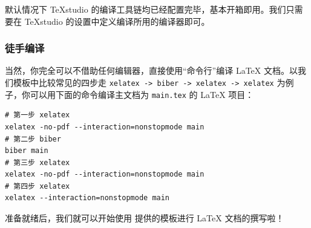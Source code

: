 默认情况下 \TeX studio 的编译工具链均已经配置完毕，基本开箱即用。我们只需要在 \TeX studio 的设置中定义编译所用的编译器即可。

\subsubsection{徒手编译}

当然，你完全可以不借助任何编辑器，直接使用“命令行”编译 {\LaTeX} 文档。以我们模板中比较常见的四步走 \texttt{xelatex -> biber -> xelatex -> xelatex} 为例子，你可以用下面的命令编译主文档为 \texttt{main.tex} 的 {\LaTeX} 项目：

\begin{verbatim}
# 第一步 xelatex
xelatex -no-pdf --interaction=nonstopmode main
# 第二步 biber
biber main
# 第三步 xelatex
xelatex -no-pdf --interaction=nonstopmode main
# 第四步 xelatex
xelatex --interaction=nonstopmode main
\end{verbatim}


准备就绪后，我们就可以开始使用 {\BIThesis} 提供的模板进行 {\LaTeX} 文档的撰写啦！
